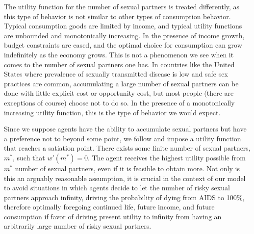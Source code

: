 \documentclass[12pt]{article}
\newcommand{\citee}[1]{\citet*{#1}}
\begin{document}
The utility function for the number of sexual partners is treated differently, as this type of behavior is not similar to other types of consumption behavior.  Typical consumption goods are limited by income, and typical utility functions are unbounded and monotonically increasing.  In the presence of income growth, budget constraints are eased, and the optimal choice for consumption can grow indefinitely as the economy grows.  This is not a phenomenon we see when it comes to the number of sexual partners one has.  In countries like the United States where prevalence of sexually transmitted disease is low and safe sex practices are common, accumulating a large number of sexual partners can be done with little explicit cost or opportunity cost, but most people (there are exceptions of course) choose not to do so.  In the presence of a monotonically increasing utility function, this is the type of behavior we would expect.

Since we suppose agents have the ability to accumulate sexual partners but have a preference not to beyond some point, we follow \citee{kremer1996} and impose a utility function that reaches a satiation point.  There exists some finite number of sexual partners, $m^*$, such that $w'(m^*)=0$.  The agent receives the highest utility possible from $m^*$ number of sexual partners, even if it is feasible to obtain more.  Not only is this an arguably reasonable assumption, it is crucial in the context of our model to avoid situations in which agents decide to let the number of risky sexual partners approach infinity, driving the probability of dying from AIDS to 100\%, therefore optimally foregoing continued life, future income, and future consumption if favor of driving present utility to infinity from having an arbitrarily large number of risky sexual partners.
\end{document}
